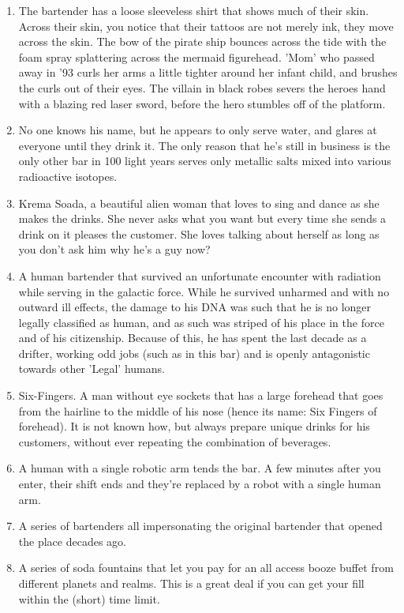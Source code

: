 \documentclass{article}
\begin{document}
\begin{enumerate}
	\item The bartender has a loose sleeveless shirt that shows much of their skin. Across their skin, you notice that their tattoos are not merely ink, they move across the skin. The bow of the pirate ship bounces across the tide with the foam spray splattering across the mermaid figurehead. 'Mom' who passed away in '93 curls her arms a little tighter around her infant child, and brushes the curls out of their eyes. The villain in black robes severs the heroes hand with a blazing red laser sword, before the hero stumbles off of the platform.
	\item No one knows his name, but he appears to only serve water, and glares at everyone until they drink it. The only reason that he's still in business is the only other bar in 100 light years serves only metallic salts mixed into various radioactive isotopes.
	\item Krema Soada, a beautiful alien woman that loves to sing and dance as she makes the drinks. She never asks what you want but every time she sends a drink on it pleases the customer. She loves talking about herself as long as you don't ask him why he's a guy now?
	\item A human bartender that survived an unfortunate encounter with radiation while serving in the galactic force. While he survived unharmed and with no outward ill effects, the damage to his DNA was such that he is no longer legally classified as human, and as such was striped of his place in the force and of his citizenship. Because of this, he has spent the last decade as a drifter, working odd jobs (such as in this bar) and is openly antagonistic towards other 'Legal' humans.
	\item Six-Fingers. A man without eye sockets that has a large forehead that goes from the hairline to the middle of his nose (hence its name: Six Fingers of forehead). It is not known how, but always prepare unique drinks for his customers, without ever repeating the combination of beverages.
	\item A human with a single robotic arm tends the bar. A few minutes after you enter, their shift ends and they're replaced by a robot with a single human arm.
	\item A series of bartenders all impersonating the original bartender that opened the place decades ago.
	\item A series of soda fountains that let you pay for an all access booze buffet from different planets and realms. This is a great deal if you can get your fill within the (short) time limit.

\end{enumerate}
\end{document}
